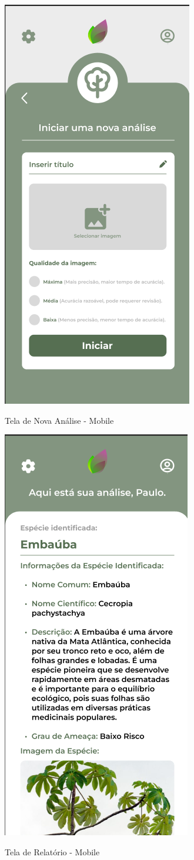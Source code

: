 \documentclass[
  a4paper,%
  12pt,%
  english,%
  brazilian,%
]{article}
\begin{document}
\begin{figure}[H]
    \centering
    \caption{Tela de Nova Análise - Mobile}
    \includegraphics[width=.3\textwidth,keepaspectratio]{Logos/mobile-tela3.png}
    \label{fig:mobile1}
\end{figure}

\begin{figure}[H]
    \centering
    \caption{Tela de Relatório - Mobile}
    \includegraphics[width=.3\textwidth,keepaspectratio]{Logos/mobile-tela4.png}
    \label{fig:mobile1}
\end{figure}
\end{document}
